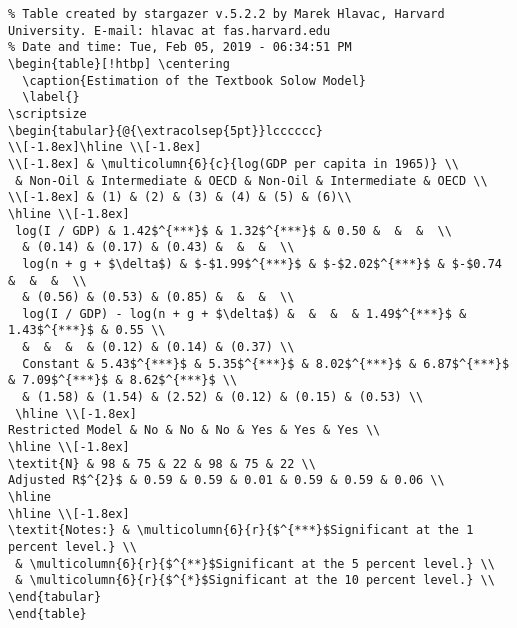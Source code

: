 \documentclass[]{book}
\theoremstyle{definition}
\theoremstyle{definition}
\theoremstyle{definition}
\theoremstyle{remark}
\begin{document}
\begin{verbatim}
% Table created by stargazer v.5.2.2 by Marek Hlavac, Harvard University. E-mail: hlavac at fas.harvard.edu
% Date and time: Tue, Feb 05, 2019 - 06:34:51 PM
\begin{table}[!htbp] \centering
  \caption{Estimation of the Textbook Solow Model}
  \label{}
\scriptsize
\begin{tabular}{@{\extracolsep{5pt}}lcccccc}
\\[-1.8ex]\hline \\[-1.8ex]
\\[-1.8ex] & \multicolumn{6}{c}{log(GDP per capita in 1965)} \\
 & Non-Oil & Intermediate & OECD & Non-Oil & Intermediate & OECD \\
\\[-1.8ex] & (1) & (2) & (3) & (4) & (5) & (6)\\
\hline \\[-1.8ex]
 log(I / GDP) & 1.42$^{***}$ & 1.32$^{***}$ & 0.50 &  &  &  \\
  & (0.14) & (0.17) & (0.43) &  &  &  \\
  log(n + g + $\delta$) & $-$1.99$^{***}$ & $-$2.02$^{***}$ & $-$0.74 &  &  &  \\
  & (0.56) & (0.53) & (0.85) &  &  &  \\
  log(I / GDP) - log(n + g + $\delta$) &  &  &  & 1.49$^{***}$ & 1.43$^{***}$ & 0.55 \\
  &  &  &  & (0.12) & (0.14) & (0.37) \\
  Constant & 5.43$^{***}$ & 5.35$^{***}$ & 8.02$^{***}$ & 6.87$^{***}$ & 7.09$^{***}$ & 8.62$^{***}$ \\
  & (1.58) & (1.54) & (2.52) & (0.12) & (0.15) & (0.53) \\
 \hline \\[-1.8ex]
Restricted Model & No & No & No & Yes & Yes & Yes \\
\hline \\[-1.8ex]
\textit{N} & 98 & 75 & 22 & 98 & 75 & 22 \\
Adjusted R$^{2}$ & 0.59 & 0.59 & 0.01 & 0.59 & 0.59 & 0.06 \\
\hline
\hline \\[-1.8ex]
\textit{Notes:} & \multicolumn{6}{r}{$^{***}$Significant at the 1 percent level.} \\
 & \multicolumn{6}{r}{$^{**}$Significant at the 5 percent level.} \\
 & \multicolumn{6}{r}{$^{*}$Significant at the 10 percent level.} \\
\end{tabular}
\end{table}
\end{verbatim}
\end{document}
